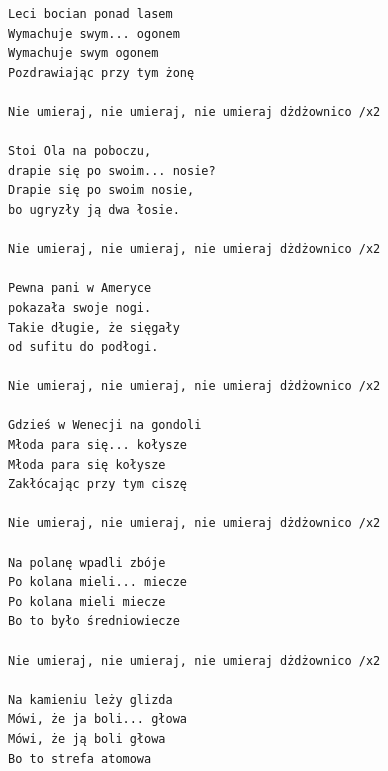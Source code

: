 \documentclass[12pt]{article}
\begin{document}
\begin{verbatim}
Leci bocian ponad lasem
Wymachuje swym... ogonem
Wymachuje swym ogonem
Pozdrawiając przy tym żonę

Nie umieraj, nie umieraj, nie umieraj dżdżownico /x2

Stoi Ola na poboczu,
drapie się po swoim... nosie?
Drapie się po swoim nosie,
bo ugryzły ją dwa łosie.

Nie umieraj, nie umieraj, nie umieraj dżdżownico /x2

Pewna pani w Ameryce
pokazała swoje nogi.
Takie długie, że sięgały
od sufitu do podłogi.

Nie umieraj, nie umieraj, nie umieraj dżdżownico /x2

Gdzieś w Wenecji na gondoli
Młoda para się... kołysze
Młoda para się kołysze
Zakłócając przy tym ciszę

Nie umieraj, nie umieraj, nie umieraj dżdżownico /x2

Na polanę wpadli zbóje
Po kolana mieli... miecze
Po kolana mieli miecze
Bo to było średniowiecze

Nie umieraj, nie umieraj, nie umieraj dżdżownico /x2

Na kamieniu leży glizda
Mówi, że ja boli... głowa
Mówi, że ją boli głowa
Bo to strefa atomowa
\end{verbatim}
\clearpage
\end{document}
